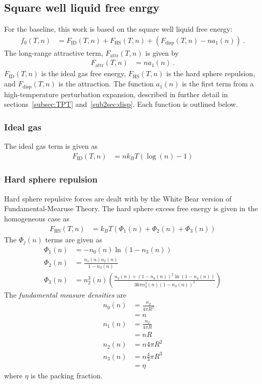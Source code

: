 \documentclass[letterpaper,twocolumn,amsmath,amssymb,prb]{revtex4-1}
\newcommand{\kT}{\ensuremath{k_BT}}
\newcommand{\fid}{\ensuremath{F_\text{ID}(T,n)}}
\newcommand{\fhs}{\ensuremath{F_\text{HS}(T,n)}}
\newcommand{\fdisp}{\ensuremath{F_\text{disp}(T,n)}}
\newcommand{\fattr}{\ensuremath{F_\text{attr}(T,n)}}
\newcommand{\1}{\ensuremath{\textbf{r}_1}}
\newcommand{\2}{\ensuremath{\textbf{r}_2}}
\newcommand{\3}{\ensuremath{\textbf{r}_3}}
\newcommand{\4}{\ensuremath{\textbf{r}_4}}
\begin{document}
\subsection{Square well liquid free enrgy}\label{subsec:SW}
For the baseline, this work is based on the square well liquid free energy:\cite{Hughes13}
\begin{align}
  f_0(T,n) &= \fid + \fhs + \left( \fdisp - n a_1(n) \right) \ .
\end{align}
The long-range attractive term, $\fattr$ is given by
\begin{align}
  \fattr &= n a_1(n) \ .
\end{align}
$\fid$ is the ideal gas free energy, $\fhs$ is the hard sphere
repulsion, and $\fdisp$ is the attraction. The function $a_1(n)$ is
the first term from a high-temperature perturbation expansion,
described in further detail in sections~\ref{subsec:TPT}
and~\ref{sub2sec:disp}. Each function is outlined below.

\subsubsection{Ideal gas}\label{sub2sec:ID}
The ideal gas term is given as
\begin{align}
  \fid &= n\kT\left(\log(n) - 1\right)
\end{align}

\subsubsection{Hard sphere repulsion}\label{sub2sec:HS}
Hard sphere repulsive forces are dealt with by the White Bear version
of Fundamental-Mearuse Theory.\cite{Roth02} The hard sphere excess
free energy is given in the homogeneous case as
\begin{align}
  \fhs &= \kT\left( \Phi_1(n) + \Phi_2(n) + \Phi_3(n) \right)
\end{align}
The $\Phi_j(n)$ terms are given as
\begin{align}
  \Phi_1(n) &= -n_0(n)\ln(1 - n_3(n)) \\
  \Phi_2(n) &= \frac{n_1(n)n_2(n)}{1 - n_3(n)} \\
  \Phi_3(n) &= n_2^3(n)\left( \frac{n_3(n) + (1 - n_3(n))^2\ln(1 - n_3(n))}{36\pi n_3^2(n)(1 - n_3(n))^2} \right)
\end{align}
The \emph{fundamental measure densities} are
\begin{align}
  n_0(n) &= \frac{n_2}{4\pi R^2} \nonumber \\
  &= n \\
  n_1(n) &= \frac{n_2}{4\pi R} \nonumber \\
  &= nR \\
  n_2(n) &= n4\pi R^2 \\
  n_3(n) &= n\frac{4}{3}\pi R^3 \nonumber \\
  &= \eta
\end{align}
where $\eta$ is the packing fraction.
\end{document}
